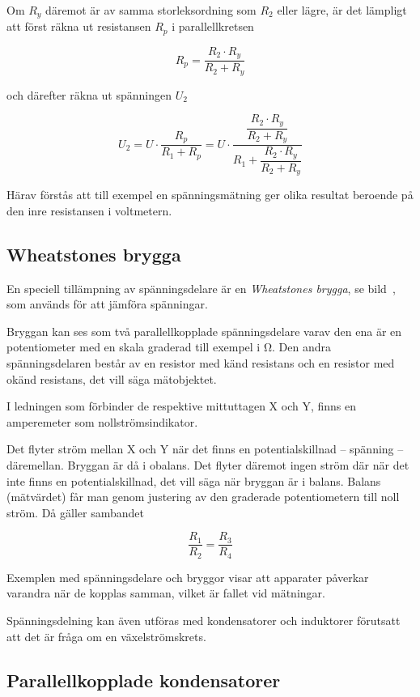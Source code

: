 Om \(R_y\) däremot är av samma storleksordning som \(R_2\) eller lägre, är det lämpligt att först räkna ut resistansen \(R_p\) i parallellkretsen 

\[
R_p = \frac{R_2 \cdot R_y}{R_2 + R_y}
\]

och därefter räkna ut spänningen \(U_2\) 

\[
U_2 = U \cdot \dfrac{ R_p }{ R_1 + R_p } = U \cdot \dfrac{ \dfrac{R_2 \cdot R_y}{R_2 + R_y} }{ R_1 + \dfrac{R_2 \cdot R_y}{R_2 + R_y} }
\]

Härav förstås att till exempel en spänningsmätning ger olika resultat beroende
på den inre resistansen i voltmetern.

\subsection{Wheatstones brygga}


En speciell tillämpning av spänningsdelare är en \emph{Wheatstones brygga}, se
bild~, som används för att jämföra spänningar.

Bryggan kan ses som två parallellkopplade spänningsdelare varav den ena är en
potentiometer med en skala graderad till exempel i \unit{\ohm}.
Den andra spänningsdelaren består av en resistor med känd resistans och en
resistor med okänd resistans, det vill säga mätobjektet.

I ledningen som förbinder de respektive mittuttagen X och Y, finns en
amperemeter som nollströmsindikator.

Det flyter ström mellan X och Y när det finns en potentialskillnad -- spänning
-- däremellan.
Bryggan är då i obalans.
Det flyter däremot ingen ström där när det inte finns en potentialskillnad,
det vill säga när bryggan är i balans.
Balans (mätvärdet) får man genom justering av den graderade potentiometern
till noll ström.
Då gäller sambandet

\[\frac{R_1}{R_2} = \frac{R_3}{R_4}\]

Exemplen med spänningsdelare och bryggor visar att apparater påverkar varandra
när de kopplas samman, vilket är fallet vid mätningar.

Spänningsdelning kan även utföras med kondensatorer och induktorer förutsatt att
det är fråga om en växelströmskrets.

\subsection{Parallellkopplade kondensatorer}
\label{parallellkopplade kondensatorer}

